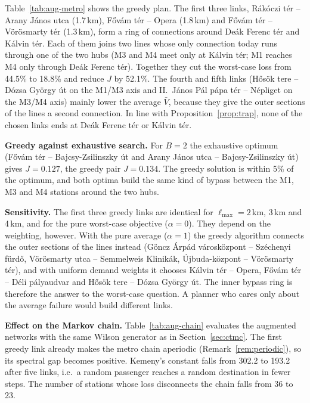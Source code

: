 \documentclass[12pt,a4paper]{article}
\theoremstyle{plain}
\theoremstyle{definition}
\theoremstyle{remark}
\begin{document}


Table~\ref{tab:aug-metro} shows the greedy plan.  The first three links,
R\'ak\'oczi t\'er -- Arany J\'anos utca (1.7\,km), F\H{o}v\'am t\'er -- Opera
(1.8\,km) and F\H{o}v\'am t\'er -- V\"or\"osmarty t\'er (1.3\,km), form a ring of
connections around De\'ak Ferenc t\'er and K\'alvin t\'er.  Each of them joins
two lines whose only connection today runs through one of the two hubs (M3 and
M4 meet only at K\'alvin t\'er; M1 reaches M4 only through De\'ak Ferenc t\'er).  Together they cut the
worst-case loss from 44.5\% to 18.8\% and reduce $J$ by
52.1\%.  The fourth and fifth links (H\H{o}s\"ok tere -- D\'ozsa
Gy\"orgy \'ut on the M1/M3 axis and II.~J\'anos P\'al p\'apa t\'er -- N\'epliget
on the M3/M4 axis) mainly lower the average $\bar V$, because they give the
outer sections of the lines a second connection.  In line with
Proposition~\ref{prop:trap}, none of the chosen links ends at De\'ak Ferenc t\'er
or K\'alvin t\'er.

\textbf{Greedy against exhaustive search.}  For $B=2$ the exhaustive optimum
(F\H{o}v\'am t\'er -- Bajcsy-Zsilinszky \'ut and Arany J\'anos utca --
Bajcsy-Zsilinszky \'ut) gives $J=0.127$, the greedy pair $J=0.134$.  The
greedy solution is within 5\% of the optimum, and both optima build the
same kind of bypass between the M1, M3 and M4 stations around the two hubs.

\textbf{Sensitivity.}  The first three greedy links are identical for
$\ell_{\max}=2$\,km, 3\,km and 4\,km, and for the pure worst-case objective
($\alpha=0$).  They depend on the weighting, however.  With the pure average
($\alpha=1$) the greedy algorithm connects the outer sections of the lines
instead (G\"oncz \'Arp\'ad v\'arosk\"ozpont -- Sz\'echenyi f\"urd\H{o},
V\"or\"osmarty utca -- Semmelweis Klinik\'ak, \'Ujbuda-k\"ozpont --
V\"or\"osmarty t\'er), and with uniform demand weights it chooses K\'alvin t\'er --
Opera, F\H{o}v\'am t\'er -- D\'eli p\'alyaudvar and H\H{o}s\"ok tere -- D\'ozsa
Gy\"orgy \'ut.  The inner bypass ring is therefore the answer to the worst-case
question.  A planner who cares only about the average failure would build
different links.



\textbf{Effect on the Markov chain.}  Table~\ref{tab:aug-chain} evaluates the
augmented networks with the same Wilson generator as in
Section~\ref{sec:ctmc}.  The first greedy link already makes the metro chain
aperiodic (Remark~\ref{rem:periodic}), so its spectral gap becomes positive.
Kemeny's constant falls from 302.2 to 193.2 after five links, i.e.\
a random passenger reaches a random destination in fewer steps.  The number of
stations whose loss disconnects the chain falls from 36 to 23.
\end{document}
